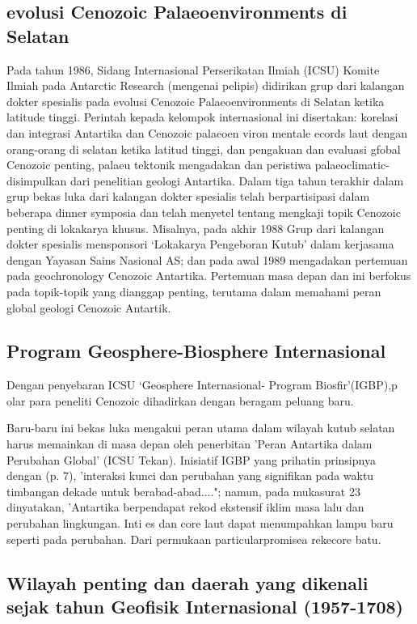 \subsection{evolusi Cenozoic Palaeoenvironments di Selatan}

		Pada tahun 1986, Sidang Internasional Perserikatan Ilmiah (ICSU) Komite Ilmiah pada Antarctic Research (mengenai pelipis) didirikan grup dari 
	kalangan dokter spesialis pada evolusi Cenozoic Palaeoenvironments di Selatan ketika latitude tinggi. Perintah kepada kelompok internasional ini 
	disertakan: korelasi dan integrasi Antartika dan Cenozoic palaeoen viron mentale ecords laut dengan orang-orang di selatan ketika latitud 
	tinggi, dan pengakuan dan evaluasi gfobal Cenozoic penting, palaeu tektonik mengadakan dan peristiwa palaeoclimatic-disimpulkan dari penelitian 
	geologi Antartika. Dalam tiga tahun terakhir dalam grup bekas luka dari kalangan dokter spesialis telah berpartisipasi dalam beberapa dinner symposia 
	dan telah menyetel tentang mengkaji topik Cenozoic penting di lokakarya khusus. Misalnya, pada akhir 1988 Grup dari kalangan dokter spesialis 
	mensponsori `Lokakarya Pengeboran Kutub' dalam kerjasama dengan Yayasan Sains Nasional AS; dan pada awal 1989 mengadakan pertemuan pada geochronology 
	Cenozoic Antartika. Pertemuan masa depan dan ini berfokus pada topik-topik yang dianggap penting, terutama dalam memahami peran global 
	geologi Cenozoic Antartik.
	
	
\subsection{Program Geosphere-Biosphere Internasional}


		Dengan penyebaran ICSU `Geosphere Internasional- Program Biosfir'(IGBP),p olar para peneliti Cenozoic dihadirkan dengan beragam peluang baru. 

	Baru-baru ini bekas luka mengakui peran utama dalam wilayah kutub selatan harus memainkan di masa depan oleh penerbitan 'Peran Antartika dalam 
	Perubahan Global' (ICSU Tekan). Inisiatif IGBP yang prihatin prinsipnya dengan (p. 7), 'interaksi kunci dan perubahan yang signifikan pada waktu 
	timbangan dekade untuk berabad-abad...."; namun, pada mukasurat 23 dinyatakan, 'Antartika berpendapat rekod ekstensif iklim masa lalu dan perubahan lingkungan. 
	Inti es dan core laut dapat menumpahkan lampu baru seperti pada perubahan. Dari permukaan particularpromisea rekecore batu.
	
	
\subsection{Wilayah penting dan daerah yang dikenali sejak tahun Geofisik Internasional (1957-1708)}

